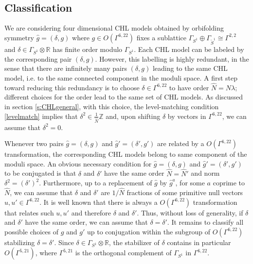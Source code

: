 \documentclass[a4paper,11pt]{article}
\newcommand{\RR}{\mathbb{R}}
\newcommand{\ZZ}{\mathbb{Z}}
\numberwithin{equation}{section}
\begin{document}
\subsection{Classification}\label{s:CHLclass}


We are considering four dimensional CHL models obtained by orbifolding symmetry $\hat g=(\delta,g)$ where $g\in O(\Gamma^{6,22})$ fixes a sublattice $\Gamma_{S^1}\oplus \Gamma_{\tilde S^1}\cong \Gamma^{2,2}$ and $\delta\in \Gamma_{S^1}\otimes\RR$ has finite order modulo $\Gamma_{S^1}$. Each CHL model can be labeled by the corresponding pair $(\delta,g)$. However, this labelling is highly redundant, in the sense that there are infinitely many pairs $(\delta,g)$ leading to the same CHL model, i.e. to the same connected component in the moduli space. A first step toward reducing this redundancy is to choose $\delta\in \Gamma^{6,22}$ to have order $\hat N=N\lambda$; different choices for the order lead to the same set of CHL models. As discussed in section \ref{s:CHLgeneral}, with this choice, the level-matching condition \eqref{levelmatch}
implies that $\delta^2\in \frac{1}{\hat N}\ZZ$ and, upon shifting $\delta$ by vectors in $\Gamma^{6,22}$, we can assume that $\delta^2=0$.

Whenever two pairs $\hat g=(\delta,g)$ and $\hat g'=(\delta',g')$ are related by a $O(\Gamma^{6,22})$ transformation, the corresponding CHL models belong to same component of the moduli space. An obvious necessary condition for $\hat g=(\delta,g)$ and $\hat g'=(\delta',g')$ to be conjugated is that $\delta$ and $\delta'$ have the same order $\hat N=\hat N'$ and norm $\delta^2=(\delta')^2$. Furthermore, up to a replacement of $\hat g$ by $\hat g^a$, for some $a$ coprime to $\hat N$, we can assume that $\delta$ and $\delta'$ are $1/\hat N$ fractions of some primitive null vectors $u,u'\in \Gamma^{6,22}$. It is well known that there is always a $O(\Gamma^{6,22})$ transformation that relates such $u,u'$ and therefore $\delta$ and $\delta'$. Thus, without loss of generality, if $\delta$ and $\delta'$ have the same order, we can assume that $\delta=\delta'$. It remains to classify all possible choices of $g$ and $g'$ up to conjugation within the subgroup of $O(\Gamma^{6,22})$ stabilizing $\delta=\delta'$. Since $\delta\in \Gamma_{S^1}\otimes \RR$, the stabilizer of $\delta$ contains in particular $O(\Gamma^{5,21})$, where $\Gamma^{5,21}$ is the orthogonal complement of $\Gamma_{S^1}$ in $\Gamma^{6,22}$. 
\end{document}
